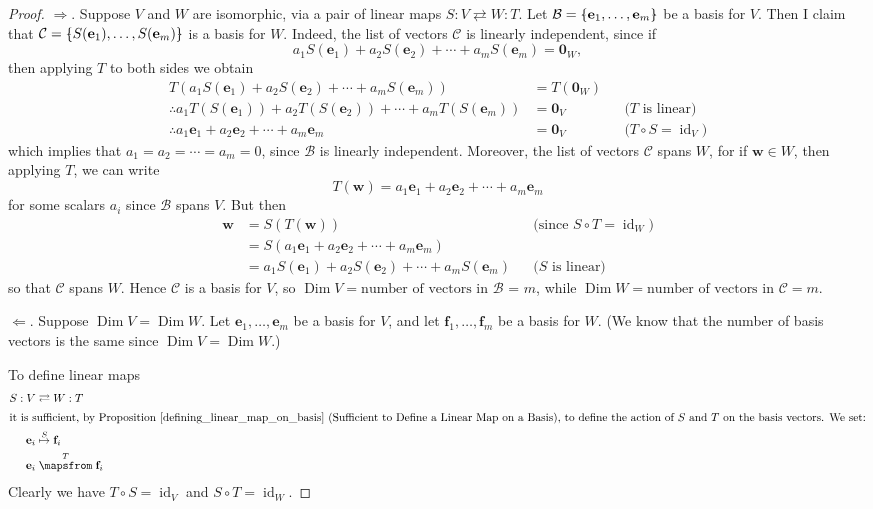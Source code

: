 \documentclass[a4paper,11pt]{book}
\theoremstyle{definition}
\newcommand{\ve}[1]{\mathbf{#1}}
\newcommand{\basis}[1]{{\mathcal #1}}
\newcommand{\bmark}{\raisebox{.53ex}{\rule{.2em}{.1ex}}}
\newcommand{\bopen}{{\protect\ooalign{\{\cr\hfil\bmark\hfil\cr}}}
\newcommand{\bclose}{{\protect\ooalign{\}\cr\hfil\bmark\hfil\cr}}}
\DeclareMathOperator{\id}{id}
\DeclareMathOperator{\Dim}{Dim}
\begin{document}
\begin{proof} $\Rightarrow$. Suppose $V$ and $W$ are isomorphic, via a pair of linear maps $S : V \rightleftarrows W : T$. Let $\basis{B} = \bopen \ve{e}_1, \ldots, \ve{e}_m \bclose$ be a basis for $V$. Then I claim that $\basis{C} = \bopen S(\ve{e}_1), \ldots, S(\ve{e}_m) \bclose$ is a basis for $W$. Indeed, the list of vectors $\basis{C}$ is linearly independent, since if
\[
 a_1 S(\ve{e}_1) + a_2 S(\ve{e}_2) + \cdots + a_m S(\ve{e}_m) = \ve{0}_W,
\]
then applying $T$ to both sides we obtain
\begin{align*}
   T(a_1 S(\ve{e}_1) + a_2 S(\ve{e}_2) + \cdots + a_m S(\ve{e}_m)) & = T(\ve{0}_W) \\
   \therefore a_1 T(S(\ve{e}_1)) + a_2 T(S(\ve{e}_2)) + \cdots + a_m T(S(\ve{e}_m)) &= \ve{0}_V && \mbox{($T$ is linear)} \\
   \therefore a_1 \ve{e}_1 + a_2 \ve{e}_2 + \cdots + a_m \ve{e}_m &= \ve{0}_V && \mbox{($T\circ S = \id_V$)} 
\end{align*}
which implies that $a_1 = a_2 = \cdots = a_m = 0$, since $\basis{B}$ is linearly independent.  Moreover, the list of vectors $\basis{C}$ spans $W$, for if $\ve{w} \in W$, then applying $T$, we can write
\[
 T(\ve{w}) = a_1 \ve{e}_1 + a_2 \ve{e}_2 + \cdots + a_m \ve{e}_m
\]
for some scalars $a_i$ since $\basis{B}$ spans $V$. But then
\begin{align*}
 \ve{w} &= S(T(\ve{w})) && \mbox{(since $S \circ T = \id_W$)} \\
 &= S(a_1 \ve{e}_1 + a_2 \ve{e}_2 + \cdots + a_m \ve{e}_m) \\ 
 &= a_1 S(\ve{e}_1) + a_2 S(\ve{e}_2) + \cdots + a_m S(\ve{e}_m) && \mbox{($S$ is linear)}
\end{align*}
so that $\basis{C}$ spans $W$. Hence $\basis{C}$ is a basis for $V$, so $\Dim V = \mbox{number of vectors in $\basis{B}$}$ = $m$, while $\Dim W = \mbox{number of vectors in $\basis{C}$} = m$. 

$\Leftarrow$. Suppose $\Dim V = \Dim W$. Let $\ve{e}_1, \ldots, \ve{e}_m$ be a basis for $V$, and let $\ve{f}_1, \ldots, \ve{f}_m$ be a basis for $W$. (We know that the number of basis vectors is the same since $\Dim V = \Dim W$.)

To define linear maps  
\begin{align*}
  S : V &\rightleftarrows W : T \\
  \intertext{it is sufficient, by Proposition \ref{defining_linear_map_on_basis} (Sufficient to Define a Linear Map on a Basis), to define the action of $S$ and $T$ on the basis vectors. We set:} 
  \ve{e}_i & \stackrel{S}{\mapsto} \ve{f}_i \\
  \ve{e}_i & \stackrel{T}{\mapsfrom} \ve{f}_i
\end{align*}
Clearly we have $T \circ S = \id_V$ and $S \circ T = \id_W$.
\end{proof}
\end{document}
